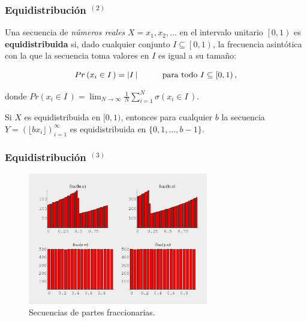 \documentclass[t, 10pt, mathserif]{beamer}
\begin{document}

\begin{frame}
  \frametitle{Equidistribución {$^{(2)}$}}

  \begin{definition}
    Una secuencia de \textit{números reales} $X = x_1, x_2, \dots$ en el intervalo unitario $\left[0, 1\right)$ es \textbf{equidistribuida} si, dado cualquier conjunto $I \subseteq \left[0, 1\right)$, la frecuencia asintótica con la que la secuencia toma valores en $I$ es igual a su tamaño:
    \pause

    \begin{equation*}
      \begin{aligned}
        Pr \left( x_i \in I\, \right) = \left| I\, \right| \hspace*{1cm} \text{para todo } I \subseteq \left[0, 1\right) \text{,}
      \end{aligned}
    \end{equation*}
    \pause

    donde $Pr \left( x_i \in I\, \right) = \lim_{N \to \infty} \frac{1}{N} \sum_{i = 1}^{N} \sigma(x_i \in I\,)$.
  \end{definition}
  \pause

  Si $X$ es equidistribuida en $[0, 1)$, entonces para cualquier $b$ la secuencia $Y = \left( \lfloor b x_i \rfloor \right)_{i = 1}^{\infty}$ es equidistribuida en $\{ 0, 1, \dots, b - 1 \}$.
\end{frame}


\begin{frame}
  \frametitle{Equidistribución {$^{(3)}$}}

  \vspace{-0.5cm}
  \begin{figure}
    \includegraphics[width=0.7\textwidth]{resources/equidistribucion.png}
    \caption{Secuencias de partes fraccionarias.}
  \end{figure}
\end{frame}
 
\end{document}
